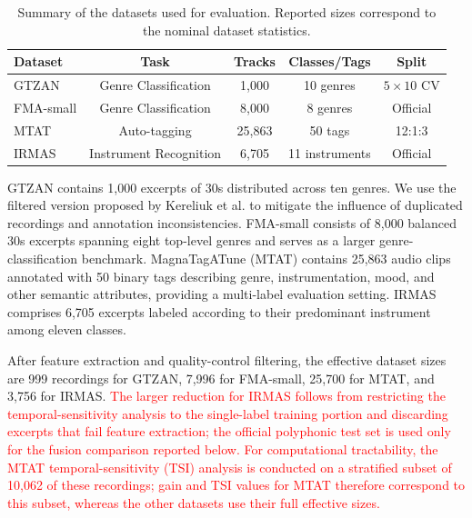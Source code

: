 \documentclass[runningheads]{llncs}
\begin{document}
\begin{table}[!htpb]
\centering
\caption{Summary of the datasets used for evaluation. Reported sizes correspond to the nominal dataset statistics.}
\label{tab:datasets}
\begin{tabular}{|l|c|c|c|c|}
\hline
Dataset & Task & Tracks & Classes/Tags & Split \\
\hline
GTZAN & Genre Classification & 1,000 & 10 genres & $5\times10$ CV \\
FMA-small & Genre Classification & 8,000 & 8 genres & Official \\
MTAT & Auto-tagging & 25,863 & 50 tags & 12:1:3 \\
IRMAS & Instrument Recognition & 6,705 & 11 instruments & Official \\
\hline
\end{tabular}
\end{table}

GTZAN \cite{tzanetakis2002musical} contains 1,000 excerpts of 30s distributed across ten genres. We use the filtered version proposed by Kereliuk et al. \cite{kereliuk2015counterexample} to mitigate the influence of duplicated recordings and annotation inconsistencies. FMA-small \cite{defferrard2017fma} consists of 8,000 balanced 30s excerpts spanning eight top-level genres and serves as a larger genre-classification benchmark. MagnaTagATune (MTAT) \cite{law2009evaluation} contains 25,863 audio clips annotated with 50 binary tags describing genre, instrumentation, mood, and other semantic attributes, providing a multi-label evaluation setting. IRMAS \cite{bosch2012comparison} comprises 6,705 excerpts labeled according to their predominant instrument among eleven classes.

After feature extraction and quality-control filtering, the effective dataset sizes are 999 recordings for GTZAN, 7,996 for FMA-small, 25,700 for MTAT, and 3,756 for IRMAS. \textcolor{red}{The larger reduction for IRMAS follows from restricting the temporal-sensitivity analysis to the single-label training portion and discarding excerpts that fail feature extraction; the official polyphonic test set is used only for the fusion comparison reported below.}
\textcolor{red}{For computational tractability, the MTAT temporal-sensitivity (TSI) analysis is conducted on a stratified subset of 10,062 of these recordings; gain and TSI values for MTAT therefore correspond to this subset, whereas the other datasets use their full effective sizes.}
\end{document}
